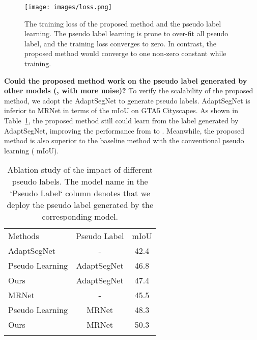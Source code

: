 \begin{figure}[t]
\begin{center}
     \texttt{[image: images/loss.png]}
\end{center} 
      \caption{ The training loss of the proposed method and the pseudo label learning. The pseudo label learning is prone to over-fit all pseudo label, and the training loss converges to zero. In contrast, the proposed method would converge to one non-zero constant while training. }
      \label{fig:loss}
\end{figure}

\noindent\textbf{Could the proposed method work on the pseudo label generated by other models (\eg, with more noise)?} To verify the scalability of the proposed method, we adopt the AdaptSegNet \cite{tsai2018learning} to generate pseudo labels. AdaptSegNet is inferior to MRNet in terms of the mIoU on GTA5  Cityscapes. As shown in Table~\ref{table:poorlabel}, the proposed method still could learn from the label generated by AdaptSegNet, improving the performance from  to . Meanwhile, the proposed method is also superior to the baseline method with the conventional pseudo learning ( mIoU).

\setlength{\tabcolsep}{10pt}
\begin{table}
\footnotesize
\begin{center}
\begin{tabular}{l|c|c}
\shline
Methods  & Pseudo Label & mIoU \\
\shline
AdaptSegNet~\cite{tsai2018learning}  & - &  42.4 \\
\hline
Pseudo Learning & AdaptSegNet & 46.8 \\
Ours   & AdaptSegNet &  47.4 \\
\shline
MRNet~\cite{zheng2019unsupervised}  & - &  45.5 \\
\hline
Pseudo Learning & MRNet & 48.3 \\
Ours   & MRNet & 50.3 \\
\shline
\end{tabular}
\end{center}
\caption{Ablation study of the impact of different pseudo labels. The model name in the `Pseudo Label` column denotes that we deploy the pseudo label generated by the corresponding model.}
\label{table:poorlabel}
\end{table}

